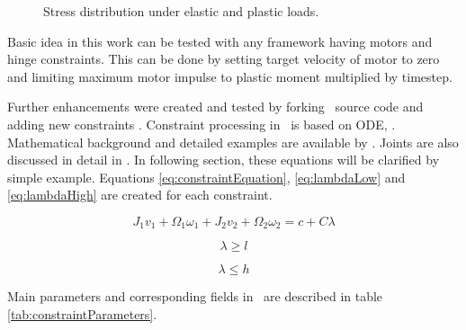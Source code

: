 \begin{figure}[htb!]
\centering
{}
\hspace{1cm}
\caption{Stress distribution under elastic and plastic loads.}
\label{fig:wp}
\end{figure}

Basic idea in this work can be tested with any framework having motors and hinge constraints.
This can be done by setting target velocity of motor to zero and limiting maximum motor impulse to plastic moment 
multiplied by timestep.

Further enhancements were created and tested by forking \bullet\ source code
and adding new constraints \cite{pbullet}.
Constraint processing in \bullet\ is based on ODE, \cite{ode}.
Mathematical background and detailed examples are available by \cite{ode.joints}.
Joints are also discussed in detail in  \citet[p.~60-90]{erleben.thesis}.
In following section, these equations will be clarified by simple example.
Equations \ref{eq:constraintEquation}, \ref{eq:lambdaLow} and
\ref{eq:lambdaHigh} 
are created for each constraint.

\begin{equation} \label{eq:constraintEquation}
J_1 v_1 + \Omega_1 \omega_1 + J_2 v_2 + \Omega_2 \omega_2 = c + C \lambda
\end{equation}

\begin{equation} \label{eq:lambdaLow}
\lambda \geq l
\end{equation}

\begin{equation} \label{eq:lambdaHigh}
\lambda \leq h
\end{equation}

Main parameters  and corresponding fields in \bullet\  
 are described in table \ref{tab:constraintParameters}.

